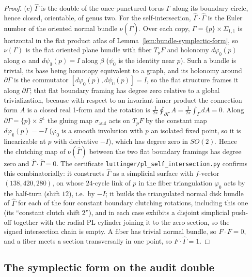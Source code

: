 \documentclass[11pt]{article}
\theoremstyle{definition}
\begin{document}
\begin{proof}
(c) $\hat\Gamma$ is the double of the once-punctured torus $\Gamma$ along
its boundary circle, hence closed, orientable, of genus two.  For the
self-intersection, $\hat\Gamma\cdot\hat\Gamma$ is the Euler number of
the oriented normal bundle $\nu(\hat\Gamma)$.  Over each copy,
$\Gamma=\{p\}\times\Sigma_{1,1}$ is horizontal in the flat product
atlas of Lemma~\ref{lem:bundle-symplectic-form}, so $\nu(\Gamma)$ is the
flat oriented plane bundle with fiber $T_pF$ and holonomy
$d\varphi_0(p)$ along $\alpha$ and $d\psi_0(p)=I$ along $\beta$
($\psi_0$ is the identity near $p$).  Such a bundle is trivial, its base
being homotopy equivalent to a graph, and its holonomy around
$\partial\Gamma$ is the commutator $[d\varphi_0(p),d\psi_0(p)]=I$, so
the flat structure frames it along $\partial\Gamma$; that flat boundary
framing has degree zero relative to a global trivialization, because with
respect to an invariant inner product the connection form $A$ is a closed
real 1-form and the rotation is
$\frac1{2\pi}\oint_{\partial\Gamma}A=\frac1{2\pi}\int_\Gamma dA=0$.  Along
$\partial\Gamma=\{p\}\times S^1$ the gluing map $\sigma_{\mathrm{aud}}$
acts on $T_pF$ by the constant map $d\varphi_0(p)=-I$ ($\varphi_0$ is a
smooth involution with $p$ an isolated fixed point, so it is linearizable
at $p$ with derivative $-I$), which has degree zero in $SO(2)$.  Hence the
clutching map of $\nu(\hat\Gamma)$ between the two flat boundary framings
has degree zero and $\hat\Gamma\cdot\hat\Gamma=0$.  The certificate
\texttt{luttinger/pl\_self\_intersection.py} confirms this
combinatorially: it constructs $\hat\Gamma$ as a simplicial surface with
$f$-vector $(138,420,280)$, on whose $24$-cycle link of $p$ in the fiber
triangulation $\varphi_0$ acts by the half-turn (shift $12$), i.e.\ by
$-I$; it builds the triangulated normal disk bundle of $\hat\Gamma$ for
each of the four constant boundary clutching rotations, including this one
(its ``constant clutch shift $2$''), and in each case exhibits a disjoint
simplicial push-off together with the radial PL cylinder joining it to the
zero section, so the signed intersection chain is empty.  A fiber has
trivial normal bundle, so
$F\cdot F=0$, and a fiber meets a section transversally in one point, so
$F\cdot\hat\Gamma=1$.
\end{proof}

\subsection{The symplectic form on the audit double}\label{sec:symplectic-double}
\end{document}
